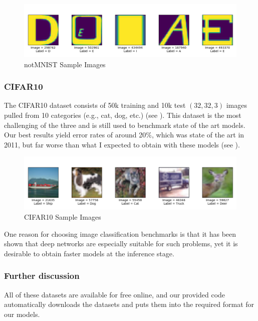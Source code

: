 \documentclass[english,a4paper,oneside]{amsart}
\theoremstyle{definition}
\begin{document}
\begin{figure}[H]
	\begin{center} \includegraphics[scale=0.5]{images/notMNIST_Sample_Images.png}\end{center}
	\caption{notMNIST Sample Images}\label{notMNISTFig}
\end{figure}

\subsubsection{CIFAR10}
The CIFAR10 dataset consists of 50k training and 10k test $(32, 32,3)$ images pulled from 10 categories (e.g., cat, dog, etc.) (see ). This dataset is the most challenging of the three and is still used to benchmark state of the art models. Our best results yield error rates of around 20\%, which was state of the art in 2011, but far worse than what I expected to obtain with these models (see ).

\begin{figure}[H]
	\begin{center} \includegraphics[scale=0.5]{images/CIFAR10_Sample_Images.png}\end{center}
	\caption{CIFAR10 Sample Images}\label{CIFAR10Fig}
\end{figure}

One reason for choosing image classification benchmarks is that it has been shown that deep networks are especially suitable for such problems, yet it is desirable to obtain faster models at the inference stage.

\subsubsection{Further discussion}
All of these datasets are available for free online, and our provided code automatically downloads the datasets and puts them into the required format for our models. 
\end{document}
